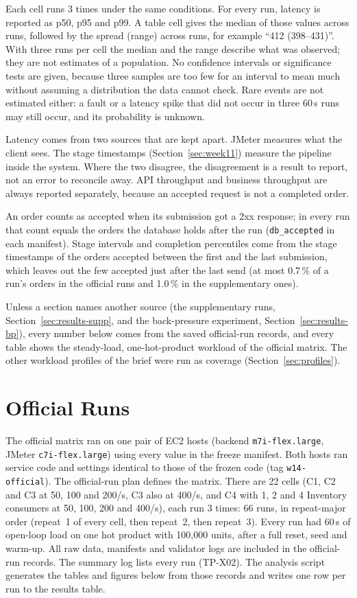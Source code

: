 \documentclass[a4paper]{report}
\begin{document}
Each cell runs 3 times under the same conditions. For every run,
latency is reported as p50, p95 and p99. A table cell gives the median of
those values across runs, followed by the spread (range) across runs, for
example ``412 (398--431)''. With three runs per cell the median and the range
describe what was observed; they are not estimates of a population. No
confidence intervals or significance tests are given, because three samples
are too few for an interval to mean much without assuming a distribution the
data cannot check. Rare events are not estimated
either: a fault or a latency spike that did not occur in three 60\,s runs may
still occur, and its probability is unknown.

Latency comes from two sources that are kept apart. JMeter measures what the
client sees. The stage timestamps (Section~\ref{sec:week11}) measure the
pipeline inside the system. Where the two disagree, the disagreement is a
result to report, not an error to reconcile away. API throughput and
business throughput are always reported separately, because an accepted
request is not a completed order.

An order counts as accepted when its submission got a 2xx response; in every
run that count equals the orders the database holds after the run
(\texttt{db\_accepted} in each manifest). Stage intervals and completion
percentiles come from the stage timestamps of the orders accepted between the
first and the last submission, which leaves out the few accepted just after
the last send (at most 0.7\,\% of a run's orders in the official runs and
1.0\,\% in the supplementary ones).

Unless a section names another source (the supplementary runs,
Section~\ref{sec:results-supp}, and the back-pressure experiment,
Section~\ref{sec:results-bp}), every number below comes from the saved
official-run records, and every table shows the steady-load, one-hot-product
workload of the official matrix. The
other workload profiles of the brief were run as coverage (Section~\ref{sec:profiles}).

\section{Official Runs}
\label{sec:results-official}

The official matrix ran on one pair of EC2 hosts
(backend \texttt{m7i-flex.large}, JMeter \texttt{c7i-flex.large}) using every
value in the freeze manifest. Both hosts ran service code
and settings identical to those of the frozen code (tag
\texttt{w14-official}). The official-run plan defines the matrix. There are 22
cells (C1, C2 and C3 at 50, 100 and 200/s, C3 also at 400/s, and C4 with 1, 2
and 4 Inventory consumers at 50, 100, 200 and 400/s), each run 3 times: 66
runs, in repeat-major order (repeat~1 of every cell, then repeat~2, then
repeat~3). Every run had 60\,s of open-loop load on one hot product with
100,000 units, after a full reset, seed and warm-up. All raw data, manifests
and validator logs are included in the official-run records. The summary log
lists every run (TP-X02). The analysis script generates the tables and figures
below from those records and writes one row per run to the results table.
\end{document}
